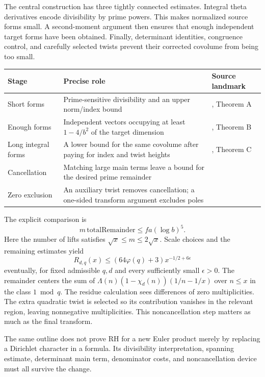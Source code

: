 The central construction has three tightly connected estimates. Integral theta derivatives encode divisibility by prime powers. This makes normalized source forms small. A second-moment argument then ensures that enough independent target forms have been obtained. Finally, determinant identities, congruence control, and carefully selected twists prevent their corrected covolume from being too small.

\begin{center}\small
\begin{tabular}{P{.18\linewidth}P{.38\linewidth}P{.34\linewidth}}
\toprule
Stage & Precise role & Source landmark\\
\midrule
Short forms & Prime-sensitive divisibility and an upper norm/index bound & , Theorem A\\[4pt]
Enough forms & Independent vectors occupying at least $1-4/b^2$ of the target dimension & , Theorem B\\[4pt]
Long integral forms & A lower bound for the same covolume after paying for index and twist heights & , Theorem C\\[4pt]
Cancellation & Matching large main terms leave a bound for the desired prime remainder & \\[4pt]
Zero exclusion & An auxiliary twist removes cancellation; a one-sided transform argument excludes poles & \\
\bottomrule
\end{tabular}
\end{center}

The explicit comparison is
\[
 m\,\mathrm{totalRemainder}\le f a(\log b)^5.
\]
Here the number of lifts satisfies $\sqrt x\le m\le2\sqrt x$. Scale choices and the remaining estimates yield
\[
 R_{d,q}(x)\le(64\varphi(q)+3)x^{-1/2+6\epsilon}
\]
eventually, for fixed admissible $q,d$ and every sufficiently small $\epsilon>0$. The remainder centers the sum of
$\Lambda(n)(1-\chi_d(n))(1/n-1/x)$ over $n\le x$ in the class $1\bmod q$.
The residue calculation sees differences of zero multiplicities. The extra quadratic twist is selected so its contribution vanishes in the relevant region, leaving nonnegative multiplicities. This noncancellation step matters as much as the final transform.\cite{guide,mainineq,criterion}

The same outline does not prove RH for a new Euler product merely by replacing a Dirichlet character in a formula. Its divisibility interpretation, spanning estimate, determinant main term, denominator costs, and noncancellation device must all survive the change.

